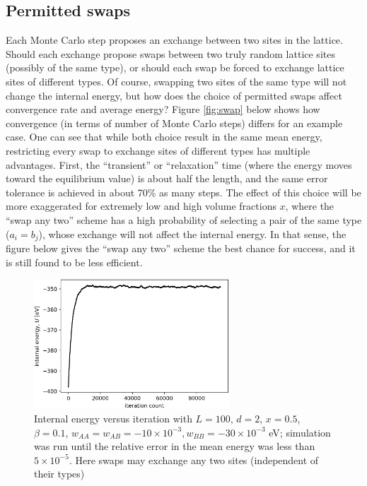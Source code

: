 \documentclass[10pt]{article}
\begin{document}
\subsection{Permitted swaps}
Each Monte Carlo step proposes an exchange between two sites in the lattice.
Should each exchange propose swaps between two truly random lattice sites (possibly of the same type), or should each swap be forced to exchange lattice sites of different types.
Of course, swapping two sites of the same type will not change the internal energy, but how does the choice of permitted swaps affect convergence rate and average energy?
Figure \ref{fig:swap} below shows how convergence (in terms of number of Monte Carlo steps) differs for an example case.
One can see that while both choice result in the same mean energy, restricting every swap to exchange sites of different types has multiple advantages.
First, the ``transient'' or ``relaxation'' time (where the energy moves toward the equilibrium value) is about half the length, and the same error tolerance is achieved in about 70\% as many steps.
The effect of this choice will be more exaggerated for extremely low and  high volume fractions $x$, where the ``swap any two'' scheme has a high probability of selecting a pair of the same type ($a_i = b_j$), whose exchange will not affect the internal energy.
In that sense, the figure below gives the ``swap any two'' scheme the best chance for success, and it is still found to be less efficient.

\begin{figure}[h!]
\centering
\includegraphics[width=0.65\textwidth]{Figures/swap_any_two_convergence.png}
\caption{Internal energy versus iteration with $L=100$, $d=2$, $x=0.5$, $\beta=0.1$, $w_{AA}=w_{AB}=-10 \times 10^{-3},w_{BB} = -30 \times 10^{-3}$ eV; simulation was run until the relative error in the mean energy was less than $5 \times 10^{-5}$.
Here swaps may exchange any two sites (independent of their types)}
\label{fig:swap_any}
\end{figure}
\end{document}
